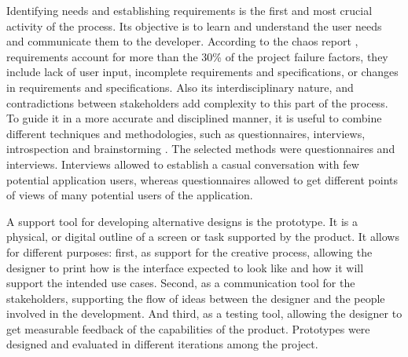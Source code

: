 Identifying needs and establishing requirements is the first and most crucial activity of the process. Its objective is to learn and understand the user needs and communicate them to the developer. According to the chaos report \cite{Group1994}, requirements account for more than the 30\% of the project failure factors, they include lack  of user input, incomplete requirements and specifications, or changes in requirements and specifications. Also its interdisciplinary nature, and contradictions between stakeholders add complexity to this part of the process. To guide it in a more accurate and disciplined manner, it is useful to combine different techniques and methodologies, such as questionnaires, interviews, introspection and brainstorming \cite{Coulin2005RequirementsTechniques}. The selected methods were questionnaires and interviews. Interviews allowed to establish a casual conversation with few potential application users, whereas questionnaires allowed to get different points of views of many potential users of the application. 

A support tool for developing alternative designs is the prototype. It is a physical, or digital outline of a screen or task supported by the product. It allows for different purposes: first, as support for the creative process, allowing the designer to print how is the interface expected to look like and how it will support the intended use cases. Second, as a communication tool for the stakeholders, supporting the flow of ideas between the designer and the people involved in the development. And third, as a testing tool, allowing the designer to get measurable feedback of the capabilities of the product. Prototypes were designed and evaluated in different iterations among the project.